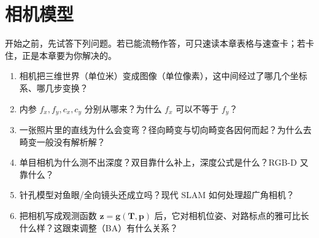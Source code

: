 \chapter{相机模型}
\label{ch:camera}


\begin{practice}[前置自测]
开始之前，先试答下列问题。若已能流畅作答，可只速读本章表格与速查卡；若卡住，正是本章要为你解决的。
\begin{enumerate}
  \item 相机把三维世界（单位米）变成图像（单位像素），这中间经过了哪几个坐标系、哪几步变换？
  \item 内参 $f_x,f_y,c_x,c_y$ 分别从哪来？为什么 $f_x$ 可以不等于 $f_y$？
  \item 一张照片里的直线为什么会变弯？径向畸变与切向畸变各因何而起？为什么去畸变一般没有解析解？
  \item 单目相机为什么测不出深度？双目靠什么补上，深度公式是什么？RGB-D 又靠什么？
  \item 针孔模型对鱼眼/全向镜头还成立吗？现代 SLAM 如何处理超广角相机？
  \item 把相机写成观测函数 $\mathbf{z}=\mathbf{g}(\mathbf{T},\mathbf{p})$ 后，它对相机位姿、对路标点的雅可比长什么样？这跟束调整（BA）有什么关系？
\end{enumerate}
\end{practice}

